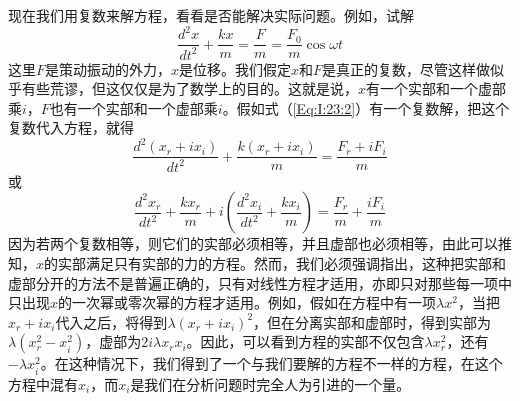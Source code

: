 现在我们用复数来解方程，看看是否能解决实际问题。例如，试解
\begin{equation}
    \label{Eq:I:23:2}
    \frac{d^2x}{dt^2} + \frac{kx}{m} = \frac{F}{m} = \frac{F_0}{m}\cos\omega t
\end{equation}
这里$F$是策动振动的外力，$x$是位移。我们假定$x$和$F$是真正的复数，尽管这样做似乎有些荒谬，但这仅仅是为了数学上的目的。这就是说，$x$有一个实部和一个虚部乘$i$，$F$也有一个实部和一个虚部乘$i$。假如式（\ref{Eq:I:23:2}）有一个复数解，把这个复数代入方程，就得
\begin{equation*}
    \frac{d^2(x_r+ix_i)}{dt^2} + \frac{k(x_r + ix_i)}{m} = \frac{F_r + iF_i}{m}
\end{equation*}
或
\begin{equation*}
    \frac{d^2x_r}{dt^2} + \frac{kx_r}{m} + i(\frac{d^2x_i}{dt^2} + \frac{kx_i}{m}) = \frac{F_r}{m} + \frac{iF_i}{m}
\end{equation*}
因为若两个复数相等，则它们的实部必须相等，并且虚部也必须相等，由此可以推知，$x$的实部满足只有实部的力的方程。然而，我们必须强调指出，这种把实部和虚部分开的方法不是普遍正确的，只有对线性方程才适用，亦即只对那些每一项中只出现$x$的一次幂或零次幂的方程才适用。例如，假如在方程中有一项$\lambda x^2$，当把$x_r+ix_i$代入之后，将得到$\lambda(x_r+ix_i)^2$，但在分离实部和虚部时，得到实部为$\lambda (x_r^2 - x_i^2)$，虚部为$2i\lambda x_rx_i$。因此，可以看到方程的实部不仅包含$\lambda x_r^2$，还有$-\lambda x_i^2$。在这种情况下，我们得到了一个与我们要解的方程不一样的方程，在这个方程中混有$x_i$，而$x_i$是我们在分析问题时完全人为引进的一个量。

